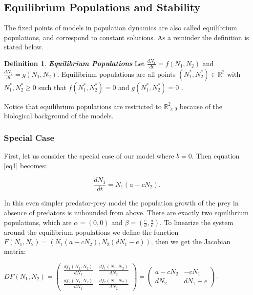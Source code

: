 \documentclass[11pt,a4paper]{scrartcl}
\theoremstyle{definition}
\newtheorem*{definition}{Definition}
\begin{document}
\subsection{Equilibrium Populations and Stability}
The fixed points of models in population dynamics are also called equilibrium populations, and correspond to constant solutions.
As a reminder the definition is stated below.
\begin{definition}{\textbf{\textit{Equilibrium Populations}}}
\newline
Let $\frac{dN_1}{dt}=f(N_1, N_2)$ and $\frac{dN_2}{dt}=g(N_1, N_2)$. Equilibrium populations are all points $(N_1^{*}, N_2^{*}) \in \mathbb{R}^2$ with $N_1^{*}, N_2^{*} \geqslant 0$ such that $f(N_1^{*},N_2^{*})=0$ and $g(N_1^{*},N_2^{*})=0$ \cite{main}. 
\end{definition}
Notice that equilibrium populations are restricted to $\mathbb{R}_{\geqslant 0}^2$ because of the biological background of the models.

\subsubsection{Special Case}
First, let us consider the special case of our model where $b=0$. Then equation \eqref{eq1} becomes:

\begin{equation} \label{eq5}
	\frac{dN_1}{dt}=N_1(a-cN_2).
\end{equation}
	
In this even simpler predator-prey model the population growth of the prey in absence of predators is unbounded from above. There are exactly two equilibrium populations, which are $\alpha=(0,0)$ and $\beta=(\frac{e}{d}, \frac{a}{c})$. To linearize the system around the equilibrium populations we define the function $F(N_1, N_2)=(N_1(a-cN_2), N_2(dN_1-e))$, then we get the Jacobian matrix:

\begin{center}
$DF(N_1, N_2)=\begin{pmatrix}
	\frac{df_1(N_1, N_2)}{dN_1} & \frac{df_1(N_1, N_2)}{dN_2} \\
	\frac{df_2(N_1, N_2)}{dN_1} & \frac{df_2(N_1, N_2)}{dN_2}
\end{pmatrix}
=\begin{pmatrix}
	a-cN_2 & -cN_1 \\
	dN_2 & dN_1-e
\end{pmatrix}$.
\end{center}
\end{document}
